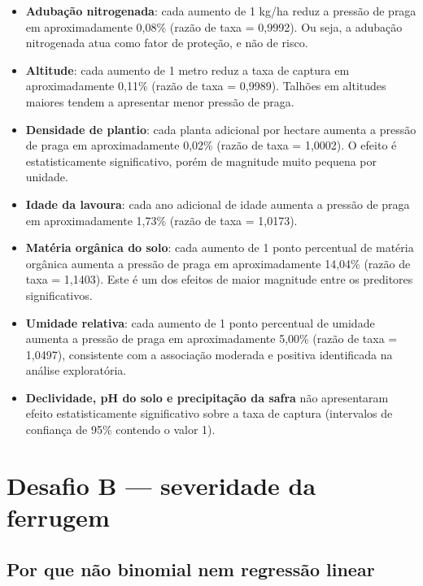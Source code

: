 \begin{itemize}
  \item \textbf{Adubação nitrogenada}: cada aumento de 1 kg/ha reduz a pressão de praga em
    aproximadamente 0,08\% (razão de taxa = 0,9992). Ou seja, a adubação nitrogenada
    atua como fator de proteção, e não de risco.
 
  \item \textbf{Altitude}: cada aumento de 1 metro reduz a taxa de captura em aproximadamente 0,11\%
    (razão de taxa = 0,9989). Talhões em altitudes maiores tendem a apresentar menor
    pressão de praga.
 
  \item \textbf{Densidade de plantio}: cada planta adicional por hectare aumenta a pressão de praga
    em aproximadamente 0,02\% (razão de taxa = 1,0002). O efeito é estatisticamente
    significativo, porém de magnitude muito pequena por unidade.
 
  \item \textbf{Idade da lavoura}: cada ano adicional de idade aumenta a pressão de praga em
    aproximadamente 1,73\% (razão de taxa = 1,0173).
 
  \item \textbf{Matéria orgânica do solo}: cada aumento de 1 ponto percentual de matéria orgânica
    aumenta a pressão de praga em aproximadamente 14,04\% (razão de taxa = 1,1403). Este
    é um dos efeitos de maior magnitude entre os preditores significativos.
 
  \item \textbf{Umidade relativa}: cada aumento de 1 ponto percentual de umidade aumenta a pressão de
    praga em aproximadamente 5,00\% (razão de taxa = 1,0497), consistente com a
    associação moderada e positiva identificada na análise exploratória.
 
  \item \textbf{Declividade, pH do solo e precipitação da safra} não apresentaram efeito
    estatisticamente significativo sobre a taxa de captura (intervalos de confiança
    de 95\% contendo o valor 1).
\end{itemize}

\section{Desafio B --- severidade da ferrugem}
\label{sec:desafioB}

\subsection{Por que não binomial nem regressão linear}

